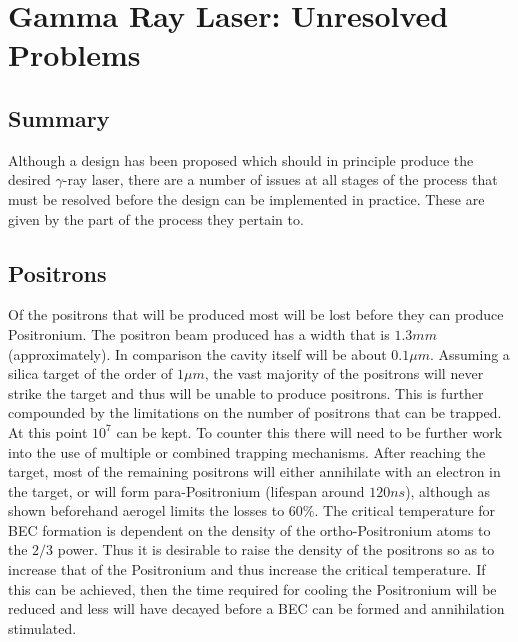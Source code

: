 
\chapter{Gamma Ray Laser: Unresolved Problems} %

\label{Chapter5} %


\section{Summary}

Although a design has been proposed which should in principle produce the desired $\gamma$-ray laser, there are a number of issues at all stages of the process that must be resolved before the design can be implemented in practice. These are given by the part of the process they pertain to.

\section{Positrons}

Of the positrons that will be produced most will be lost before they can produce Positronium. The positron beam produced has a width that is $1.3mm$ (approximately). In comparison the cavity itself will be about $0.1\mu m$. Assuming a silica target of the order of $1\mu m$, the vast majority of the positrons will never strike the target and thus will be unable to produce positrons. This is further compounded by the limitations on the number of positrons that can be trapped. At this point $10^7$ can be kept. To counter this there will need to be further work into the use of multiple or combined trapping mechanisms.
\newline
\newline
After reaching the target, most of the remaining positrons will either annihilate with an electron in the target, or will form para-Positronium (lifespan around $120 ns$), although as shown beforehand aerogel limits the losses to $60\%$.
\newline
\newline
The critical temperature for BEC formation is dependent on the density of the ortho-Positronium atoms to the $2/3$ power. Thus it is desirable to raise the density of the positrons so as to increase that of the Positronium and thus increase the critical temperature. If this can be achieved, then the time required for cooling the Positronium will be reduced and less will have decayed before a BEC can be formed and annihilation stimulated.

